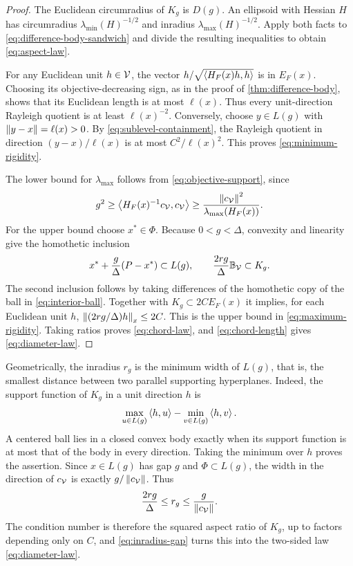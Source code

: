 \begin{proof}
The Euclidean circumradius of $K_g$ is $D(g)$. An ellipsoid with Hessian
$H$ has circumradius $\lambda_{\min}(H)^{-1/2}$ and inradius
$\lambda_{\max}(H)^{-1/2}$. Apply both facts to
\eqref{eq:difference-body-sandwich} and divide the resulting inequalities
to obtain \eqref{eq:aspect-law}.

For any Euclidean unit $h\in\mathcal V$, the vector
$h/\sqrt{\left\langle H_F(x)h,h\right\rangle}$ is in $E_F(x)$. Choosing its
objective-decreasing sign, as in the proof of
\cref{thm:difference-body}, shows that its Euclidean length is at most
$\ell(x)$. Thus every unit-direction Rayleigh quotient is at least
$\ell(x)^{-2}$. Conversely, choose $y\in L(g)$ with
$\left\lVert y-x\right\rVert=\ell(x)>0$. By \eqref{eq:sublevel-containment},
the Rayleigh quotient in direction $(y-x)/\ell(x)$ is at most
$C^2/\ell(x)^2$. This proves \eqref{eq:minimum-rigidity}.

The lower bound for $\lambda_{\max}$ follows from
\eqref{eq:objective-support}, since
\[
 g^2\geq\left\langle H_F(x)^{-1}c_{\mathcal V},c_{\mathcal V}\right\rangle
      \geq\frac{\left\lVert c_{\mathcal V}\right\rVert^2}{\lambda_{\max}(H_F(x))}.
\]
For the upper bound choose $x^*\in\Phi$. Because $0<g<\Delta$,
convexity and linearity give the homothetic inclusion
\begin{equation}
 x^*+\frac{g}{\Delta}(P-x^*)\subset L(g),
 \qquad \frac{2rg}{\Delta}\mathbb B_{\mathcal V}\subset K_g.
 \label{eq:homothetic-ball}
\end{equation}
The second inclusion follows by taking differences of the homothetic
copy of the ball in \eqref{eq:interior-ball}. Together with
$K_g\subset2C E_F(x)$ it implies, for each Euclidean unit $h$,
$\left\lVert (2rg/\Delta)h\right\rVert_x\leq2C$. This is the upper bound in
\eqref{eq:maximum-rigidity}. Taking ratios proves
\eqref{eq:chord-law}, and \eqref{eq:chord-length} gives
\eqref{eq:diameter-law}.
\end{proof}

Geometrically, the inradius $r_g$ is the minimum width of $L(g)$, that
is, the smallest distance between two parallel supporting hyperplanes.
Indeed, the support function of $K_g$ in a
unit direction $h$ is
\[
 \max_{u\in L(g)}\left\langle h,u\right\rangle
 -\min_{v\in L(g)}\left\langle h,v\right\rangle.
\]
A centered ball lies in a closed convex body exactly when its support
function is at most that of the body in every direction. Taking the
minimum over $h$ proves the assertion. Since $x\in L(g)$ has gap $g$ and
$\Phi\subset L(g)$, the width in the direction of $c_{\mathcal V}$ is exactly
$g/\left\lVert c_{\mathcal V}\right\rVert$. Thus
\begin{equation}
 \frac{2rg}{\Delta}\leq r_g\leq\frac{g}{\left\lVert c_{\mathcal V}\right\rVert}.
 \label{eq:inradius-gap}
\end{equation}
The condition number is therefore the squared aspect ratio of $K_g$,
up to factors depending only on $C$, and \eqref{eq:inradius-gap} turns
this into the two-sided law \eqref{eq:diameter-law}.

